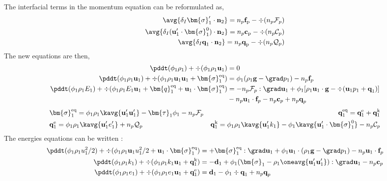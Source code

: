 The interfacial terms in the momentum equation can be reformulated as,
\begin{align*}
    \avg{\delta_I \bm{\sigma}_1' \cdot \textbf{n}_2}
    = n_p \textbf{f}_\text{p} - \div (n_p \mathcal{F}_p)\\
    \avg{\delta_I (\textbf{u}_1' \cdot \bm{\sigma}_1^0)\cdot \textbf{n}_2}
    = n_p \textbf{c}_\text{p} - \div (n_p\mathcal{C}_p)\\
    \avg{\delta_I \textbf{q}_1 \cdot \textbf{n}_2}
    = n_p \textbf{q}_\text{p} - \div (n_p \mathcal{Q}_p)
\end{align*}
The new equations are then, 
\begin{align}
    \pddt (\phi_1 \rho_1)  
    + \div (
        \phi_1 \rho_1\textbf{u}_1
    )
    &= 
    0\\
    \pddt (\phi_1 \rho_1\textbf{u}_1)  
    + \div (
        \phi_1 \rho_1\textbf{u}_1\textbf{u}_1
        + \bm{\sigma}_1^\text{eq}
    )
    &= 
    \phi_1 (\rho_1 \textbf{g} 
    - \grad p_1 ) 
    -  n_p \textbf{f}_p\\
    \pddt (\phi_1\rho_1E_1)  
    + \div (
        \phi_1\rho_1E_1\textbf{u}_1
        + \bm{q}_1^\text{eq}
        + \textbf{u}_1 \cdot \bm{\sigma}_1^\text{eq}
        )
    &= 
    -n_p \mathcal{F}_p :\grad \textbf{u}_1
    +\phi_1 [\rho_1\textbf{u}_1 \cdot \textbf{g} 
    - \div(\textbf{u}_1p_1 + \textbf{q}_1)]\nonumber\\
    &- n_p \textbf{u}_1 \cdot \textbf{f}_p
    - n_p \textbf{c}_p
    + n_p \textbf{q}_p
\end{align} 
\begin{align*}
    &\bm{\sigma}_1^\text{eq}
    = \phi_1\rho_1\kavg{\textbf{u}_1'\textbf{u}_1'}
    - \bm{\tau}_1 \phi_1
    - n_p \mathcal{F}_p
    &\textbf{q}_1^\text{eq}
    =\textbf{q}_1^\text{e} +\textbf{q}_1^\text{k} \\
    &\textbf{q}_1^\text{e}
    = \phi_1\rho_1 \kavg{\textbf{u}_1' e_1'} + n_p \mathcal{Q}_p
    &\textbf{q}_1^\text{k}
    = \phi_1\rho_1 \kavg{\textbf{u}_1' k_1} 
    - \phi_1\kavg{\textbf{u}_1' \cdot \bm{\sigma}_1^0}
    - n_p \mathcal{C}_p 
\end{align*}
The energies equations can be written : 
\begin{align}
    \pddt (\phi_1 \rho_1u_1^2/2)  
    + \div (
        \phi_1 \rho_1\textbf{u}_1u_1^2/2
        + \textbf{u}_1 \cdot \bm{\sigma}_1^\text{eq}
    )
    &= 
    + \bm{\sigma}_1^\text{eq} : \grad \textbf{u}_1
    + \phi_1  \textbf{u}_1\cdot(\rho_1 \textbf{g} - \grad p_1) 
    - n_p \textbf{u}_1\cdot \textbf{f}_p\\
    \pddt (\phi_1\rho_1k_1)  
    + \div (
        \phi_1\rho_1k_1\textbf{u}_1
        + \textbf{q}_1^\text{k} 
        )
    &= 
    - \textbf{d}_1
    + \phi_1(\bm{\sigma}_1 - \rho_1 \oneavg{\textbf{u}_1'\textbf{u}_1'} ): \grad \textbf{u}_1
    - n_p \textbf{c}_p\\
    \pddt (\phi_1\rho_1e_1)  
    + \div (
        \phi_1 \rho_1e_1\textbf{u}_1
        +
        \textbf{q}_1^\text{e} 
        )
    &= 
    \textbf{d}_1
    - \phi_1 \div \textbf{q}_1
    + n_p \textbf{q}_p
\end{align}
